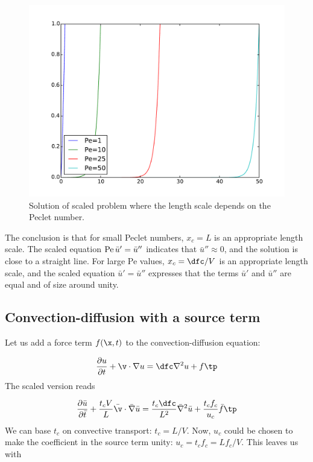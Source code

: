 \documentclass[graybox,envcountchap,sectrefs,final]{svmonodo}
\begin{document}
\begin{figure}[!ht]  %
  \centerline{\includegraphics[width=0.9\linewidth]{fig-scaling/boundary_layer1D_scale2.pdf}}
  \caption{
  Solution of scaled problem where the length scale depends on the Peclet number. \label{scale:convdiff:fig:rescaled}
  }
\end{figure}


The conclusion is that for small Peclet numbers, $x_c=L$ is an
appropriate length scale.
The scaled equation $\hbox{Pe}\,\bar u' = \bar u''$ indicates that $\bar
u''\approx 0$, and the solution is close to a straight line.  For
large Pe values, $x_c=\dfc/V$ is an appropriate length scale, and the
scaled equation $\bar u' = \bar u''$
expresses that the terms $\bar u'$ and $\bar u''$ are
equal and of size around unity.



\subsection{Convection-diffusion with a source term}
\label{scale:convdiff:f}

Let us add a force term $f(\x,t)$ to the convection-diffusion equation:

\begin{equation}
\frac{\partial u}{\partial t} + \v\cdot\nabla u =
\dfc\nabla^2 u + f\tp
\label{scale:convdiff:pde2}
\end{equation}
The scaled version reads

\[
\frac{\partial\bar u}{\partial\bar t} +
\frac{t_cV}{L}\bar\v\cdot\bar\nabla \bar u =
\frac{t_c\dfc}{L^2}\bar\nabla^2 \bar u +
\frac{t_cf_c}{u_c}\bar f\tp
\]
We can base $t_c$ on convective transport: $t_c = L/V$. Now,
$u_c$ could be chosen to make the coefficient in the source term unity:
$u_c = t_cf_c = Lf_c/V$.
This leaves us with
\end{document}
